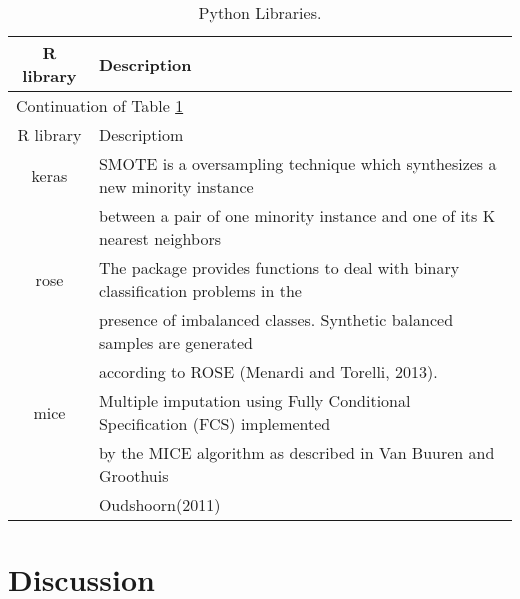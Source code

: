  \begin{longtable}[c]{| c | l |}
 \caption{Python Libraries.\label{long}}\\

 
 \hline
 R library & Description\\
 \hline
 \endfirsthead

 \hline
 \multicolumn{2}{|l|}{Continuation of Table \ref{long}}\\
 \hline
 R library & Descriptiom\\
 \hline
 \endhead

 \hline
 \endlastfoot

keras & SMOTE is a oversampling technique which synthesizes a new minority instance  \\
& between a pair of one minority instance and one of its K nearest neighbors\\
 \hline
rose & The package provides functions to deal with binary classification problems in the \\
& presence of imbalanced classes. Synthetic balanced samples are generated \\ 
& according to ROSE (Menardi and Torelli, 2013).\\
 \hline
 mice & Multiple imputation using Fully Conditional Specification (FCS) implemented \\
 & by the MICE algorithm as described in Van Buuren and Groothuis \\ 
 & Oudshoorn(2011)
 \end{longtable}

\section{Discussion}
